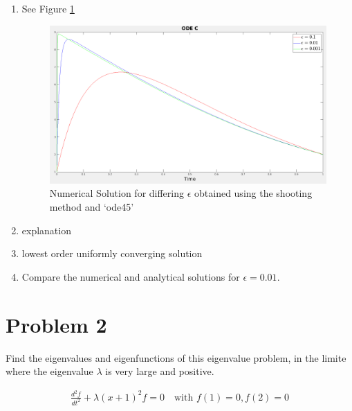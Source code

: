 \documentclass{article}
\begin{document}
\begin{enumerate}[label=\alph*.]
    \item See Figure \ref{fig:ODEC_num_sol}
        \begin{figure}[ht]
            \centering
            \includegraphics[width=\textwidth]{images/ODEC.png}
            \caption{Numerical Solution for differing $\epsilon$ obtained using
            the shooting method and `ode45'}
            \label{fig:ODEC_num_sol}
        \end{figure}
    \item explanation
    \item lowest order uniformly converging solution
    \item Compare the numerical and analytical solutions for $\epsilon = 0.01$. 
\end{enumerate}

\vspace{10pt}

\hline

\vspace{10pt}

\section*{Problem 2}
Find the eigenvalues and eigenfunctions of this eigenvalue problem, in the
limite where the eigenvalue $\lambda$ is very large and positive. 

\begin{gather*}
    \frac{d^2f}{dt^2} + \lambda(x+1)^2f = 0 \quad \text{with } f(1) = 0, f(2) =
    0
\end{gather*}
\end{document}
